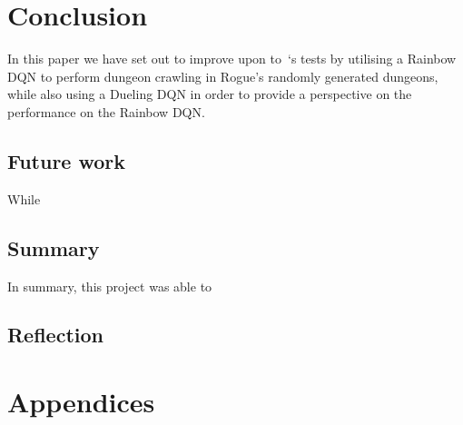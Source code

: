 \documentclass[12pt,a4paper]{article}
\begin{document}
    \section{Conclusion}\label{sec:conclusion}
    In this paper we have set out to improve upon to~\citet{asperti18}`s tests by utilising a Rainbow
    DQN to perform dungeon crawling in Rogue's randomly generated dungeons, while also using a Dueling DQN in order to
    provide a perspective on the performance on the Rainbow DQN.


    
    \subsection{Future work}\label{subsec:future-work}
    While


    \subsection{Summary}\label{subsec:summary4}
    In summary, this project was able to
    
    \subsection{Reflection}\label{subsec:reflection}



    \medskip

    
    

    \medskip

    \appendix
    \section*{Appendices}
\end{document}
